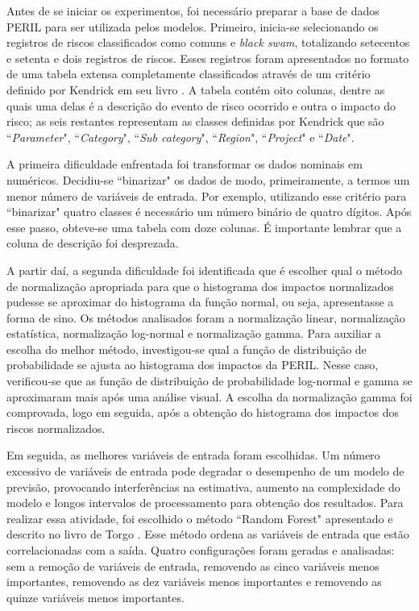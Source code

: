 Antes de se iniciar os experimentos, foi necessário preparar a base de dados PERIL para ser utilizada pelos modelos. Primeiro, inicia-se selecionando os registros de riscos classificados como comuns e \textit{black swam}, totalizando setecentos e setenta e dois registros de riscos. Esses registros foram apresentados no formato de uma tabela extensa completamente classificados através de um critério definido por Kendrick em seu livro \cite{kendrick2003identifying}. A tabela contém oito colunas, dentre as quais uma delas é a descrição do evento de risco ocorrido e outra o impacto do risco; as seis restantes representam as classes definidas por Kendrick que são ``\textit{Parameter}", ``\textit{Category}", ``\textit{Sub category}", ``\textit{Region}", ``\textit{Project}" e ``\textit{Date}". 

A primeira dificuldade enfrentada foi transformar os dados nominais em numéricos. Decidiu-se ``binarizar" os dados de modo, primeiramente, a termos um menor número de variáveis de entrada. Por exemplo, utilizando esse critério para ``binarizar" quatro classes é necessário um número binário de quatro dígitos. Após esse passo, obteve-se uma tabela com doze colunas. É importante lembrar que a coluna de descrição foi desprezada. 

A partir daí, a segunda dificuldade foi identificada que é escolher qual o método de normalização apropriada para que o histograma dos impactos normalizados pudesse se aproximar do histograma da função normal, ou seja, apresentasse a forma de sino. Os métodos analisados foram a normalização linear, normalização estatística, normalização log-normal e normalização gamma. Para auxiliar a escolha do melhor método, investigou-se qual a função de distribuição de probabilidade se ajusta ao histograma dos impactos da PERIL. Nesse caso, verificou-se que as função de distribuição de probabilidade log-normal e gamma se aproximaram mais após uma análise visual. A escolha da normalização gamma foi comprovada, logo em seguida, após a obtenção do histograma dos impactos dos riscos normalizados.

Em seguida, as melhores variáveis de entrada foram escolhidas. Um número excessivo de variáveis de entrada pode degradar o desempenho de um modelo de previsão, provocando interferências na estimativa, aumento na complexidade do modelo e longos intervalos de processamento para obtenção dos resultados. Para realizar essa atividade, foi escolhido o método ``Random Forest" apresentado e descrito no livro de Torgo \cite{torgo2003data}. Esse método ordena as variáveis de entrada que estão correlacionadas com a saída. Quatro configurações foram geradas e analisadas: sem a remoção de variáveis de entrada, removendo as cinco variáveis menos importantes, removendo as dez variáveis menos importantes e removendo as quinze variáveis menos importantes.

